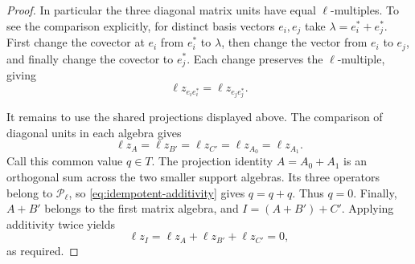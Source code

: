 \begin{proof}
In particular the three diagonal matrix units have equal
$\ell$-multiples.  To see the comparison explicitly, for distinct basis
vectors $e_i,e_j$ take $\lambda=e_i^*+e_j^*$.  First change the covector
at $e_i$ from $e_i^*$ to $\lambda$, then change the vector from $e_i$
to $e_j$, and finally change the covector to $e_j^*$.  Each change
preserves the $\ell$-multiple, giving
\[
 \ell z_{e_i e_i^*}=\ell z_{e_j e_j^*}.
\]

It remains to use the shared projections displayed above.  The
comparison of diagonal units in each algebra gives
\[
 \ell z_A=\ell z_{B'}=\ell z_{C'}
           =\ell z_{A_0}=\ell z_{A_1}.
\]
Call this common value $q\in T$.  The projection identity
$A=A_0+A_1$ is an orthogonal sum across the two smaller support
algebras.  Its three operators belong to $\mathcal P_\ell$, so
\eqref{eq:idempotent-additivity} gives $q=q+q$.  Thus $q=0$.
Finally, $A+B'$ belongs to the first matrix algebra, and
$I=(A+B')+C'$.  Applying additivity twice yields
\[
 \ell z_I=\ell z_A+\ell z_{B'}+\ell z_{C'}=0,
\]
as required.
\end{proof}
